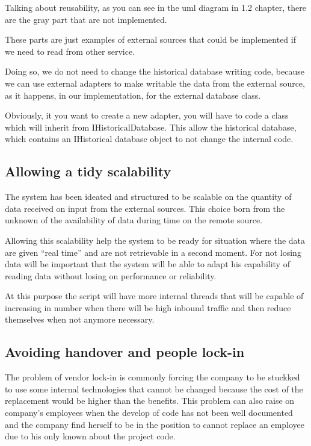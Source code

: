Talking about reusability, as you can see in the uml diagram in 1.2 chapter, there are the gray part that are not implemented. 

These parts are just examples of external sources that could be implemented if we need to read from other service. 

Doing so, we do not need to change the historical database writing code, because we can use external adapters to make writable the data from the external source, as it happens, in our implementation, for the external database class.

Obviously, it you want to create a new adapter, you will have to code a class which will inherit from IHistoricalDatabase. This allow the historical database, which contains an IHistorical database object to not change the internal code.

\subsection{Allowing a tidy scalability}

The system has been ideated and structured to be scalable on the quantity of data received on input from the external sources.
This choice born from the unknown of the availability of data during time on the remote source.

Allowing this scalability help the system to be ready for situation where the data are given “real time” and are not retrievable in a second moment. For not losing data will be important that the system will be able to adapt his capability of reading data without losing on performance or reliability.

At this purpose the script will have more internal threads that will be capable of increasing in number when there will be high inbound traffic and then reduce themselves when not anymore necessary.

\subsection{Avoiding handover and people lock-in}

The problem of vendor lock-in is commonly forcing the company to be stuckked to use some internal technologies that cannot be changed because the cost of the replacement would be higher than the benefits. This problem can also raise on company’s employees when the develop of code has not been well documented and the company find herself to be in the position to cannot replace an employee due to his only known about the project code.

